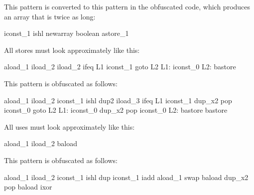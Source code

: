 This pattern is converted to this pattern in the obfuscated code,
which produces an array that is twice as long:

\begin{listing}{1}
iconst_1
ishl
newarray boolean
astore_1
\end{listing}

All stores must look approximately like this:

\begin{listing}{1}
aload_1
iload_2
iload_2
ifeq L1
iconst_1
goto L2
L1:
iconst_0
L2:
bastore
\end{listing}

This pattern is obfuscated as follows:

\begin{listing}{1}
aload_1
iload_2
iconst_1
ishl
dup2
iload_3
ifeq L1
iconst_1
dup_x2
pop
iconst_0
goto L2
L1:
iconst_0
dup_x2
pop
iconst_0
L2:
bastore
bastore
\end{listing}

All uses must look approximately like this:

\begin{listing}{1}
aload_1
iload_2
baload
\end{listing}

This pattern is obfuscated as follows:

\begin{listing}{1}
aload_1
iload_2
iconst_1
ishl
dup
iconst_1
iadd
aload_1
swap
baload
dup_x2
pop
baload
ixor
\end{listing}

